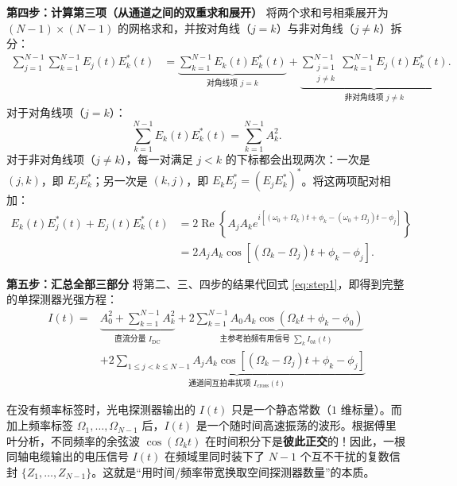 \documentclass[UTF8, a4paper, 11pt]{ctexart}
\begin{document}
\begin{derivation}[单点探测器光强 $I(t) = |E(t)|^2$ 的逐行展开]
\textbf{第四步：计算第三项（从通道之间的双重求和展开）}
将两个求和号相乘展开为 $(N-1)\times(N-1)$ 的网格求和，并按对角线（$j=k$）与非对角线（$j \neq k$）拆分：
\begin{align*}
    \sum_{j=1}^{N-1}\sum_{k=1}^{N-1} E_j(t)E_k^*(t) &= \underbrace{\sum_{k=1}^{N-1} E_k(t)E_k^*(t)}_{\text{对角线项 } j=k} + \underbrace{\sum_{\substack{j=1 \\ j \neq k}}^{N-1}\sum_{k=1}^{N-1} E_j(t)E_k^*(t)}_{\text{非对角线项 } j \neq k}.
\end{align*}
对于对角线项（$j=k$）：
\[
    \sum_{k=1}^{N-1} E_k(t)E_k^*(t) = \sum_{k=1}^{N-1} A_k^2.
\]
对于非对角线项（$j \neq k$），每一对满足 $j < k$ 的下标都会出现两次：一次是 $(j, k)$，即 $E_j E_k^*$；另一次是 $(k, j)$，即 $E_k E_j^* = (E_j E_k^*)^*$。将这两项配对相加：
\begin{align*}
    E_k(t)E_j^*(t) + E_j(t)E_k^*(t) &= 2\operatorname{Re}\left\{ A_j A_k e^{i[(\omega_0+\Omega_k)t + \phi_k - (\omega_0+\Omega_j)t - \phi_j]} \right\} \\
    &= 2A_j A_k \cos\left[ (\Omega_k - \Omega_j)t + \phi_k - \phi_j \right].
\end{align*}

\textbf{第五步：汇总全部三部分}
将第二、三、四步的结果代回式 \eqref{eq:step1}，即得到完整的单探测器光强方程：
\[
    \boxed{
    \begin{aligned}
    I(t) = {} & \underbrace{A_0^2 + \sum_{k=1}^{N-1} A_k^2}_{\text{直流分量 } I_{\mathrm{DC}}} + \underbrace{2\sum_{k=1}^{N-1} A_0 A_k \cos(\Omega_k t + \phi_k - \phi_0)}_{\text{主参考拍频有用信号 } \sum_k I_{0k}(t)} \\
    & + \underbrace{2\sum_{1 \le j < k \le N-1} A_j A_k \cos\left[(\Omega_k - \Omega_j)t + \phi_k - \phi_j\right]}_{\text{通道间互拍串扰项 } I_{\mathrm{cross}}(t)}
    \end{aligned}
    }
\]
\end{derivation}

\begin{enginsight}
在没有频率标签时，光电探测器输出的 $I(t)$ 只是一个静态常数（$1$ 维标量）。而加上频率标签 $\Omega_1, \dots, \Omega_{N-1}$ 后，$I(t)$ 是一个随时间高速振荡的波形。根据傅里叶分析，不同频率的余弦波 $\cos(\Omega_k t)$ 在时间积分下是\textbf{彼此正交}的！因此，一根同轴电缆输出的电压信号 $I(t)$ 在频域里同时装下了 $N-1$ 个互不干扰的复数信封 $\{Z_1, \dots, Z_{N-1}\}$。这就是“用时间/频率带宽换取空间探测器数量”的本质。
\end{enginsight}
\end{document}
